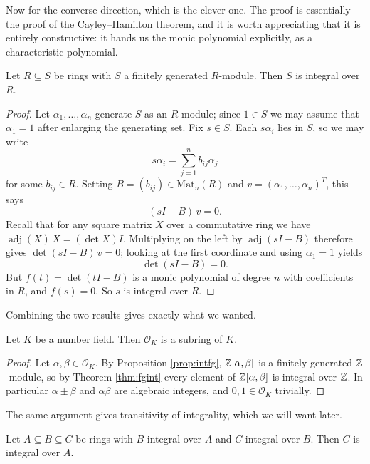 \documentclass[a4paper]{scrartcl}
\renewcommand{\OO}{\mathcal{O}}
\newcommand{\adj}{\operatorname{adj}}
\begin{document}
Now for the converse direction, which is the clever one. The proof is essentially the proof of the Cayley--Hamilton theorem, and it is worth appreciating that it is entirely constructive: it hands us the monic polynomial explicitly, as a characteristic polynomial.

\begin{theorem}\label{thm:fgint}
	Let $R \subseteq S$ be rings with $S$ a finitely generated $R$-module. Then $S$ is integral over $R$.
\end{theorem}

\begin{proof}
	Let $\alpha_1, \dots, \alpha_n$ generate $S$ as an $R$-module; since $1 \in S$ we may assume that $\alpha_1 = 1$ after enlarging the generating set. Fix $s \in S$. Each $s\alpha_i$ lies in $S$, so we may write
	$$s\alpha_i = \sum_{j=1}^n b_{ij}\alpha_j$$
	for some $b_{ij} \in R$. Setting $B = (b_{ij}) \in \mathrm{Mat}_n(R)$ and $v = (\alpha_1, \dots, \alpha_n)^T$, this says
	$$(sI - B)\,v = 0.$$
	Recall that for any square matrix $X$ over a commutative ring we have $\adj(X)\,X = (\det X) I$. Multiplying on the left by $\adj(sI - B)$ therefore gives $\det(sI - B)\, v = 0$; looking at the first coordinate and using $\alpha_1 = 1$ yields
	$$\det(sI - B) = 0.$$
	But $f(t) = \det(tI - B)$ is a monic polynomial of degree $n$ with coefficients in $R$, and $f(s) = 0$. So $s$ is integral over $R$.
\end{proof}

Combining the two results gives exactly what we wanted.

\begin{corollary}\label{cor:OKring}
	Let $K$ be a number field. Then $\OO_K$ is a subring of $K$.
\end{corollary}

\begin{proof}
	Let $\alpha, \beta \in \OO_K$. By Proposition \ref{prop:intfg}, $\mathbb{Z}[\alpha,\beta]$ is a finitely generated $\mathbb{Z}$-module, so by Theorem \ref{thm:fgint} every element of $\mathbb{Z}[\alpha,\beta]$ is integral over $\mathbb{Z}$. In particular $\alpha \pm \beta$ and $\alpha\beta$ are algebraic integers, and $0, 1 \in \OO_K$ trivially.
\end{proof}

The same argument gives transitivity of integrality, which we will want later.

\begin{corollary}\label{cor:transint}
	Let $A \subseteq B \subseteq C$ be rings with $B$ integral over $A$ and $C$ integral over $B$. Then $C$ is integral over $A$.
\end{corollary}
\end{document}
